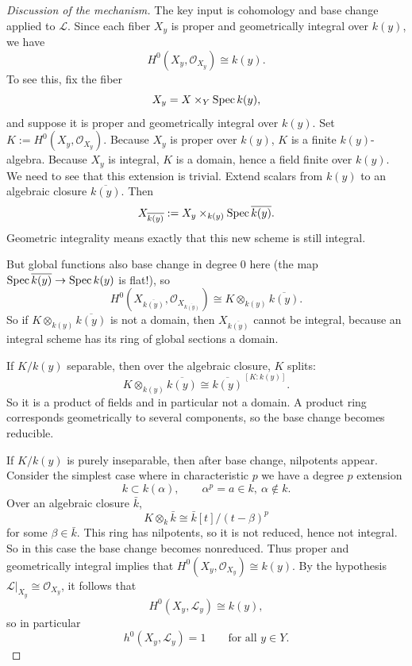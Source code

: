 \documentclass[12pt]{article}
\begin{document}
\begin{proof}[Discussion of the mechanism]
    The key input is cohomology and base change applied to \(\mathcal L\). Since each fiber \(X_y\) is proper and geometrically integral over \(k(y)\), we have
    \[
        H^0(X_y,\mathcal O_{X_y}) \cong k(y).
    \]
    To see this, fix the fiber
    \[
        X_y=X\times_Y \operatorname{Spec} k(y),
    \]
    and suppose it is proper and geometrically integral over $k(y)$. Set
    $K:=H^0(X_y,\mathcal O_{X_y})$. Because $X_y$ is proper over $k(y)$, $K$ is a finite $k(y)$-algebra. Because $X_y$ is integral, $K$ is a domain, hence a field finite over $k(y)$. We need to see that this extension is trivial. Extend scalars from $k(y)$ to an algebraic closure $\overline{k(y)}$. Then
    \[
        X_{\overline{k(y)}}:=X_y\times_{k(y)} \operatorname{Spec} \overline{k(y)}.
    \]
    Geometric integrality means exactly that this new scheme is still integral.

    But global functions also base change in degree $0$ here (the map $\operatorname{Spec} \overline{k(y)}\to \operatorname{Spec} k(y)$ is flat!), so
    \[
        H^0(X_{\overline{k(y)}},\mathcal O_{X_{\overline{k(y)}}})
        \cong
        K\otimes_{k(y)} \overline{k(y)}.
    \]
    So if $K\otimes_{k(y)} \overline{k(y)}$ is not a domain, then $X_{\overline{k(y)}}$ cannot be integral, because an integral scheme has its ring of global sections a domain.

    If $K/k(y)$ separable, then over the algebraic closure, $K$ splits:
    \[
        K\otimes_{k(y)} \overline{k(y)}
        \cong
        \overline{k(y)}^{\, [K:k(y)]}.
    \]
    So it is a product of fields and in particular not a domain. A product ring corresponds geometrically to several components, so the base change becomes reducible.

    If $K/k(y)$ is purely inseparable, then after base change, nilpotents appear. Consider the simplest case where in characteristic $p$ we have a degree $p$ extension
    \[
        k \subset k(\alpha),\qquad \alpha^p=a\in k,\ \alpha\notin k.
    \]
    Over an algebraic closure $\bar k$,
    \[
        K\otimes_k \bar k
        \cong
        \bar k[t]/(t-\beta)^p
    \]
    for some $\beta\in \bar k$. This ring has nilpotents, so it is not reduced, hence not integral. So in this case the base change becomes nonreduced. Thus proper and geometrically integral implies that $H^0(X_y,\mathcal O_{X_y})\cong k(y)$.
    By the hypothesis \(\mathcal L|_{X_y}\cong \mathcal O_{X_y}\), it follows that
    \[
        H^0(X_y,\mathcal L_y)\cong k(y),
    \]
    so in particular
    \[
        h^0(X_y,\mathcal L_y)=1
        \qquad\text{for all }y\in Y.
    \]


\end{proof}
\end{document}
